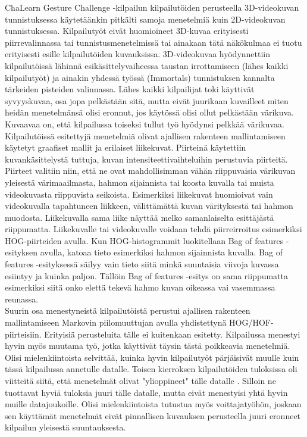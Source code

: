 ChaLearn Gesture Challenge -kilpailun kilpailutöiden perusteella 3D-videokuvan tunnistuksessa käytetäänkin pitkälti samoja 
menetelmiä kuin 2D-videokuvan tunnistuksessa. Kilpailutyöt eivät huomioineet 3D-kuvaa erityisesti piirrevalinnassa tai tunnistusmenetelmissä 
tai ainakaan tätä näkökulmaa ei tuotu erityisesti esille kilpailutöiden kuvauksissa. 3D-videokuvaa hyödynnettiin kilpailutöissä lähinnä esikäsittelyvaiheessa taustan irrottamiseen 
(lähes kaikki kilpailutyöt) ja ainakin yhdessä työssä (Immortals) tunnistuksen kannalta tärkeiden pisteiden valinnassa. Lähes kaikki kilpailijat 
toki käyttivät syvyyskuvaa, osa jopa pelkästään sitä, mutta eivät juurikaan kuvailleet miten heidän menetelmänsä olisi eronnut, jos käytössä olisi ollut pelkästään värikuva.
Kuvaavaa on, että kilpailussa toiseksi tullut työ hyödynsi pelkkää värikuvaa.\\

Kilpailutöissä esitettyjä menetelmiä olivat ajallisen rakenteen mallintamiseen käytetyt graafiset mallit ja erilaiset liikekuvat. Piirteinä käytettiin 
kuvankäsittelystä tuttuja, kuvan intensiteettivaihteluihin perustuvia piirteitä. Piirteet valitiin niin, että ne ovat mahdollisimman vähän riippuvaisia
 värikuvan yleisestä värimaailmasta, hahmon sijainnista tai koosta kuvalla tai muista videokuvasta riippuvista seikoista. Esimerkiksi liikekuvat huomioivat 
vain videokuvalla tapahtuneen liikkeen, välittämättä kuvan värityksestä tai hahmon muodosta. Liikekuvalla sama liike näyttää melko samanlaiselta esittäjästä 
riippumatta. Liikekuvalle tai videokuvalle voidaan tehdä piirreirroitus esimerkiksi 
HOG-piirteiden avulla. Kun HOG-histogrammit luokitellaan Bag of features -esityksen avulla, katoaa tieto esimerkiksi hahmon sijainnista kuvalla.
Bag of features -esityksessä säilyy vain tieto siitä minkä suuntaisia viivoja kuvassa esiintyy ja kuinka paljon. Tällöin Bag of features -esitys on sama
riippumatta esimerkiksi siitä onko elettä tekevä hahmo kuvan oikeassa vai vasemmassa reunassa.\\

Suurin osa menestyneistä kilpailutöistä perustui ajallisen rakenteen mallintamiseen Markovin piilomuuttujan avulla yhdistettynä HOG/HOF-piirteisiin. 
Erityisiä perusteluita tälle ei kuitenkaan esitetty. Kilpailussa menestyi hyvin myös muutama työ, jotka käyttivät täysin tästä poikkeavia menetelmiä.\\

Olisi mielenkiintoista selvittää, kuinka hyvin kilpailutyöt pärjäisivät muulle kuin tässä kilpailussa annetulle datalle. 
Toisen kierroksen kilpailutöiden tuloksissa oli viitteitä siitä, että menetelmät olivat "ylioppineet"  tälle datalle \citep {chalearn2}. 
Silloin ne tuottavat hyviä tuloksia juuri tälle datalle, mutta eivät menestyisi yhtä hyvin muille datajoukoille. Olisi mielenkiintoista 
tutustua myös voittajatyöhön, joskaan sen käyttämät menetelmät eivät pinnallisen kuvauksen perusteella juuri eronneet kilpailun yleisestä suuntauksesta.\\

